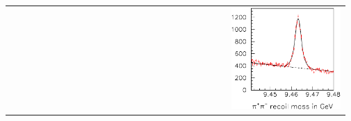 \documentclass[landscape]{article}
\begin{document}
\begin{slide:efficiency}
\begin{tabular}{p{0.62\linewidth} c p{0.35\linewidth}}
\begin{minipage}{\linewidth}
\begin{itemize}
    \end{itemize}
  \end{minipage} & & \begin{minipage}{\linewidth}
    \includegraphics[width=\linewidth]{plots/pipimass}
  \end{minipage}
\end{tabular}

\end{slide:efficiency}
\end{document}
